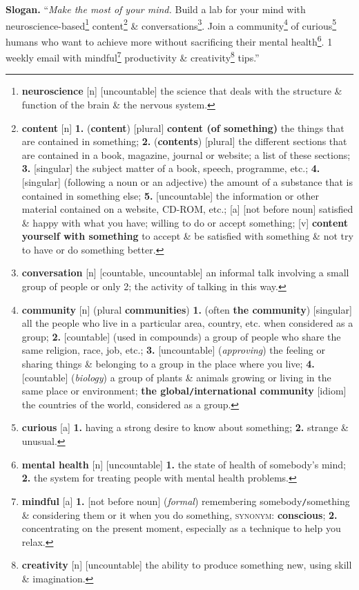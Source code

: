 \documentclass[oneside]{book}
\numberwithin{equation}{section}
\begin{document}
\textbf{Slogan.} ``\textit{Make the most of your mind.} Build a lab for your mind with neuroscience-based\footnote{\textbf{neuroscience} [n] [uncountable] the science that deals with the structure \& function of the brain \& the nervous system.} content\footnote{\textbf{content} [n] \textbf{1.} (\textbf{content}) [plural] \textbf{content (of something)} the things that are contained in something; \textbf{2.} (\textbf{contents}) [plural] the different sections that are contained in a book, magazine, journal or website; a list of these sections; \textbf{3.} [singular] the subject matter of a book, speech, programme, etc.; \textbf{4.} [singular] (following a noun or an adjective) the amount of a substance that is contained in something else; \textbf{5.} [uncountable] the information or other material contained on a website, CD-ROM, etc.; [a] [not before noun] satisfied \& happy with what you have; willing to do or accept something; [v] \textbf{content yourself with something} to accept \& be satisfied with something \& not try to have or do something better.} \& conversations\footnote{\textbf{conversation} [n] [countable, uncountable] an informal talk involving a small group of people or only 2; the activity of talking in this way.}. Join a community\footnote{\textbf{community} [n] (plural \textbf{communities}) \textbf{1.} (often \textbf{the community}) [singular] all the people who live in a particular area, country, etc. when considered as a group; \textbf{2.} [countable] (used in compounds) a group of people who share the same religion, race, job, etc.; \textbf{3.} [uncountable] (\textit{approving}) the feeling or sharing things \& belonging to a group in the place where you live; \textbf{4.} [countable] (\textit{biology}) a group of plants \& animals growing or living in the same place or environment; \textbf{the global\texttt{/}international community} [idiom] the countries of the world, considered as a group.} of curious\footnote{\textbf{curious} [a] \textbf{1.} having a strong desire to know about something; \textbf{2.} strange \& unusual.} humans who want to achieve more without sacrificing their mental health\footnote{\textbf{mental health} [n] [uncountable] \textbf{1.} the state of health of somebody's mind; \textbf{2.} the system for treating people with mental health problems.}. 1 weekly email with mindful\footnote{\textbf{mindful} [a] \textbf{1.} [not before noun] (\textit{formal}) remembering somebody\texttt{/}something \& considering them or it when you do something, \textsc{synonym}: \textbf{conscious}; \textbf{2.} concentrating on the present moment, especially as a technique to help you relax.} productivity \& creativity\footnote{\textbf{creativity} [n] [uncountable] the ability to produce something new, using skill \& imagination.} tips.''
\end{document}
